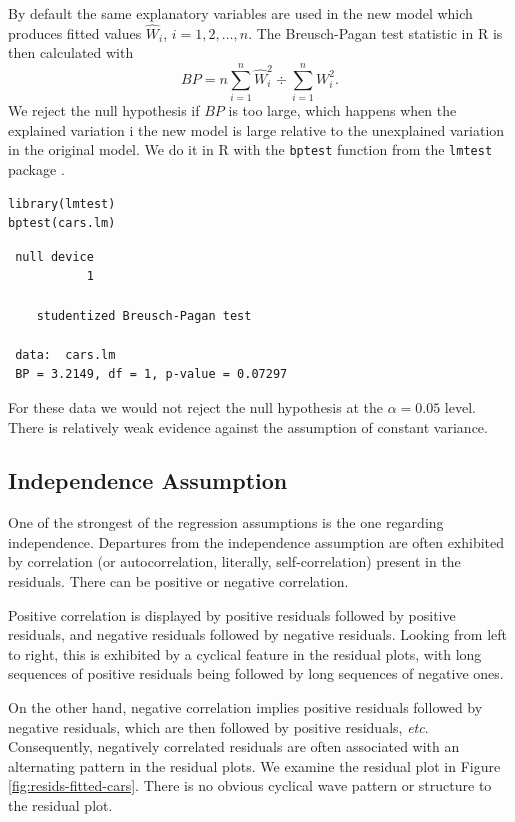 \documentclass[captions=tableheading]{scrbook}
\begin{document}
By default the same explanatory variables are used in the new model which produces fitted values \(\hat{W}_{i}\), \(i=1,2,\ldots,n\). The Breusch-Pagan test statistic in \textsf{R} is then calculated with 
\begin{equation}
BP=n\sum_{i=1}^{n}\hat{W}_{i}^{2}\div\sum_{i=1}^{n}W_{i}^{2}.
\end{equation}
We reject the null hypothesis if \(BP\) is too large, which happens when the explained variation i the new model is large relative to the unexplained variation in the original model.
We do it in \textsf{R} with the \texttt{bptest} function from the \texttt{lmtest} package \cite{Zeileislmtest}. 

\begin{verbatim}
library(lmtest)
bptest(cars.lm)
\end{verbatim}

\begin{verbatim}
 null device 
           1
  
 	studentized Breusch-Pagan test
 
 data:  cars.lm 
 BP = 3.2149, df = 1, p-value = 0.07297
\end{verbatim}

For these data we would not reject the null hypothesis at the \(\alpha=0.05\) level. There is relatively weak evidence against the assumption of constant variance. 
\subsection{Independence Assumption}
\label{sec-11-4-3}

\label{sub:Independence-Assumption}

One of the strongest of the regression assumptions is the one regarding independence. Departures from the independence assumption are often exhibited by correlation (or autocorrelation, literally, self-correlation) present in the residuals. There can be positive or negative correlation.

Positive correlation is displayed by positive residuals followed by positive residuals, and negative residuals followed by negative residuals. Looking from left to right, this is exhibited by a cyclical feature in the residual plots, with long sequences of positive residuals being followed by long sequences of negative ones.

On the other hand, negative correlation implies positive residuals followed by negative residuals, which are then followed by positive residuals, \emph{etc}. Consequently, negatively correlated residuals are often associated with an alternating pattern in the residual plots. We examine the residual plot in Figure \ref{fig:resids-fitted-cars}. There is no obvious cyclical wave pattern or structure to the residual plot. 
\end{document}
